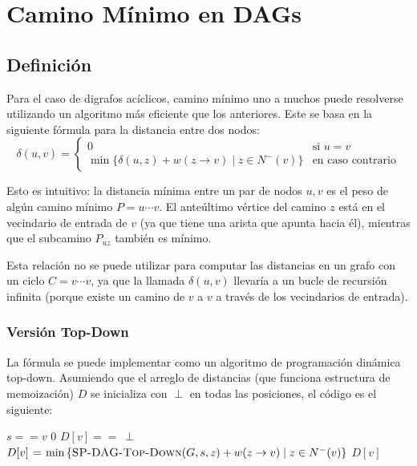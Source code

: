 \documentclass[a4paper]{report}
\newcommand{\si}{\text{si }}
\newcommand{\ecc}{\text{en caso contrario}}
\begin{document}
\section{Camino Mínimo en DAGs}

\subsection{Definición}

Para el caso de digrafos acíclicos, camino mínimo uno a muchos puede resolverse utilizando un algoritmo más eficiente que los anteriores. Este se basa en la siguiente fórmula para la distancia entre dos nodos:
$$
    \delta(u, v) =
    \begin{cases}
        0                                                             & \si u = v \\
        \min{\{\delta(u, z) + w(z \rightarrow v) \mid z \in N^-(v)\}} & \ecc
    \end{cases}
$$

Esto es intuitivo: la distancia mínima entre un par de nodos $u, v$ es el peso de algún camino mínimo $P = u \cdots v$. El anteúltimo vértice del camino $z$ está en el vecindario de entrada de $v$ (ya que tiene una arista que apunta hacia él), mientras que el subcamino $P_{uz}$ también es mínimo.

Esta relación no se puede utilizar para computar las distancias en un grafo con un ciclo $C = v \cdots v$, ya que la llamada $\delta(u, v)$ llevaría a un bucle de recursión infinita (porque existe un camino de $v$ a $v$ a través de los vecindarios de entrada).

\subsubsection{Versión Top-Down}

La fórmula se puede implementar como un algoritmo de programación dinámica top-down. Asumiendo que el arreglo de distancias (que funciona estructura de memoización) $D$ se inicializa con $\perp$ en todas las posiciones, el código es el siguiente:

\begin{codebox}
    \li \If $s == v$ \Then
    \li \Return $0$
    \End
    \li \If $D[v] ==\ \perp$ \Then
    \li $D[v] \mathrel{\hspace{1pt}=\hspace{1pt}} \min{\{\textnormal{\scshape SP-DAG-Top-Down}(G, s, z) + w(z \rightarrow v) \mid z \in N^-(v)\}}$
    \End
    \li \Return $D[v]$
\end{codebox}
\end{document}
